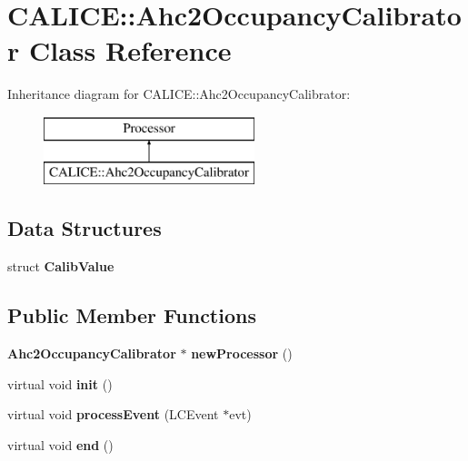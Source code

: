 \section{C\-A\-L\-I\-C\-E\-:\-:Ahc2\-Occupancy\-Calibrator Class Reference}
\label{classCALICE_1_1Ahc2OccupancyCalibrator}
Inheritance diagram for C\-A\-L\-I\-C\-E\-:\-:Ahc2\-Occupancy\-Calibrator\-:\begin{figure}[H]
\begin{center}
\leavevmode
\includegraphics[height=2.000000cm]{classCALICE_1_1Ahc2OccupancyCalibrator}
\end{center}
\end{figure}
\subsection*{Data Structures}
\begin{DoxyCompactItemize}
\item 
struct {\bf Calib\-Value}
\end{DoxyCompactItemize}
\subsection*{Public Member Functions}
\begin{DoxyCompactItemize}
\item 
{\bf Ahc2\-Occupancy\-Calibrator} $\ast$ {\bfseries new\-Processor} ()\label{classCALICE_1_1Ahc2OccupancyCalibrator_ab850d8d70dc40faec36a35bb92f1b7d4}

\item 
virtual void {\bfseries init} ()\label{classCALICE_1_1Ahc2OccupancyCalibrator_ac7f750b9e258f3ad92a09ad64a94827b}

\item 
virtual void {\bfseries process\-Event} (L\-C\-Event $\ast$evt)\label{classCALICE_1_1Ahc2OccupancyCalibrator_a6c72b27a0e96d8ecc564fdcbd4b8f272}

\item 
virtual void {\bfseries end} ()\label{classCALICE_1_1Ahc2OccupancyCalibrator_a6b5ac3a8f00949655788e5677775807a}

\end{DoxyCompactItemize}
